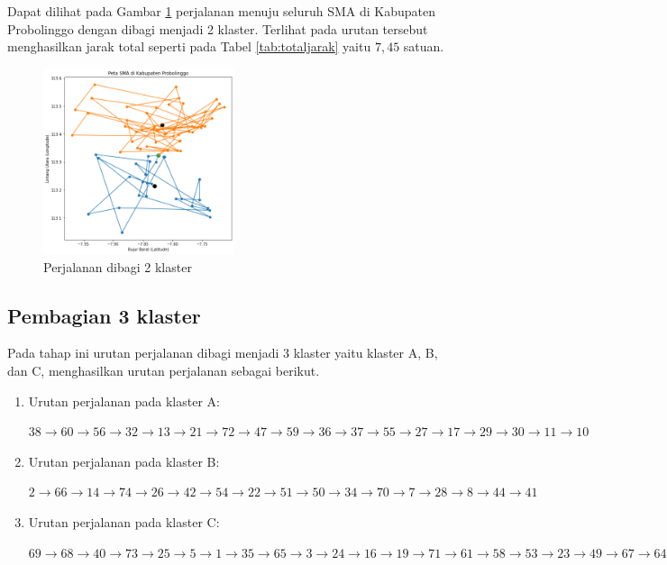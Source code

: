 Dapat dilihat pada Gambar \ref{fig:hasil_mtsp2} perjalanan menuju seluruh SMA di Kabupaten Probolinggo dengan dibagi menjadi 2 klaster. Terlihat pada urutan tersebut menghasilkan jarak total seperti pada Tabel \ref{tab:totaljarak} yaitu $7,45$ satuan.

\begin{figure}[H]
\centering
\includegraphics[width=0.5\textwidth]{Gambar/hasil_mtsp/2}
\caption{Perjalanan dibagi 2 klaster}
\label{fig:hasil_mtsp2}
\end{figure}

\subsection{Pembagian 3 klaster}

Pada tahap ini urutan perjalanan dibagi menjadi 3 klaster yaitu klaster A, B, dan C, menghasilkan urutan perjalanan sebagai berikut.

\begin{enumerate}
\item Urutan perjalanan pada klaster A:

$
38 \rightarrow 60 \rightarrow 56 \rightarrow 32 \rightarrow 13 \rightarrow 21 \rightarrow 72 \rightarrow 47 \rightarrow 59 \rightarrow 36 \rightarrow 37 \rightarrow 55 \rightarrow 27 \rightarrow 17 \rightarrow 29 \rightarrow 30 \rightarrow 11 \rightarrow 10
$ 

\item Urutan perjalanan pada klaster B:

$
2 \rightarrow 66 \rightarrow 14 \rightarrow 74 \rightarrow 26 \rightarrow 42 \rightarrow 54 \rightarrow 22 \rightarrow 51 \rightarrow 50 \rightarrow 34 \rightarrow 70 \rightarrow 7 \rightarrow 28 \rightarrow 8 \rightarrow 44 \rightarrow 41
$

\item Urutan perjalanan pada klaster C:

$
69 \rightarrow 68 \rightarrow 40 \rightarrow 73 \rightarrow 25 \rightarrow 5 \rightarrow 1 \rightarrow 35 \rightarrow 65 \rightarrow 3 \rightarrow 24 \rightarrow 16 \rightarrow 19 \rightarrow 71 \rightarrow 61 \rightarrow 58 \rightarrow 53 \rightarrow 23 \rightarrow 49 \rightarrow 67 \rightarrow 64 \rightarrow 33 \rightarrow 4 \rightarrow 18 \rightarrow 39 \rightarrow 48 \rightarrow 20 \rightarrow 75 \rightarrow 63 \rightarrow 15 \rightarrow 31 \rightarrow 43 \rightarrow 57 \rightarrow 9 \rightarrow 6 \rightarrow 12 \rightarrow 46 \rightarrow 45 \rightarrow 52 \rightarrow 62
$
\end{enumerate}

